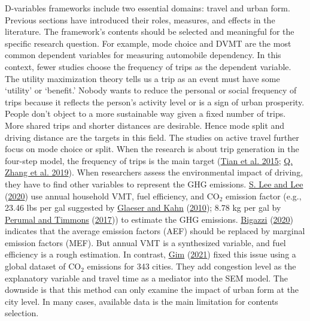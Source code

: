 \documentclass[
  12pt,
]{article}
\begin{document}
D-variables frameworks include two essential domains: travel and urban form. Previous sections have introduced their roles, measures, and effects in the literature. The framework's contents should be selected and meaningful for the specific research question. For example, mode choice and DVMT are the most common dependent variables for measuring automobile dependency. In this context, fewer studies choose the frequency of trips as the dependent variable. The utility maximization theory tells us a trip as an event must have some `utility' or `benefit.' Nobody wants to reduce the personal or social frequency of trips because it reflects the person's activity level or is a sign of urban prosperity. People don't object to a more sustainable way given a fixed number of trips. More shared trips and shorter distances are desirable. Hence mode split and driving distance are the targets in this field. The studies on active travel further focus on mode choice or split. When the research is about trip generation in the four-step model, the frequency of trips is the main target (\protect\hyperlink{ref-tianTrafficGeneratedMixedUse2015}{Tian et al. 2015}; \protect\hyperlink{ref-zhangHouseholdTripGeneration2019}{Q. Zhang et al. 2019}). When researchers assess the environmental impact of driving, they have to find other variables to represent the GHG emissions. \protect\hyperlink{ref-leeComparingImpactsLocal2020}{S. Lee and Lee} (\protect\hyperlink{ref-leeComparingImpactsLocal2020}{2020}) use annual household VMT, fuel efficiency, and CO\(_2\) emission factor (e.g., 23.46 lbs per gal suggested by \protect\hyperlink{ref-glaeserGreennessCitiesCarbon2010}{Glaeser and Kahn} (\protect\hyperlink{ref-glaeserGreennessCitiesCarbon2010}{2010}); 8.78 kg per gal by \protect\hyperlink{ref-perumalContextualDensityUS2017}{Perumal and Timmons} (\protect\hyperlink{ref-perumalContextualDensityUS2017}{2017})) to estimate the GHG emissions. \protect\hyperlink{ref-bigazziMarginalEmissionFactors2020}{Bigazzi} (\protect\hyperlink{ref-bigazziMarginalEmissionFactors2020}{2020}) indicates that the average emission factors (AEF) should be replaced by marginal emission factors (MEF). But annual VMT is a synthesized variable, and fuel efficiency is a rough estimation. In contrast, \protect\hyperlink{ref-gimAnalyzingCitylevelEffects2021}{Gim} (\protect\hyperlink{ref-gimAnalyzingCitylevelEffects2021}{2021}) fixed this issue using a global dataset of CO\(_2\) emissions for 343 cities. They add congestion level as the explanatory variable and travel time as a mediator into the SEM model. The downside is that this method can only examine the impact of urban form at the city level. In many cases, available data is the main limitation for contents selection.
\end{document}
